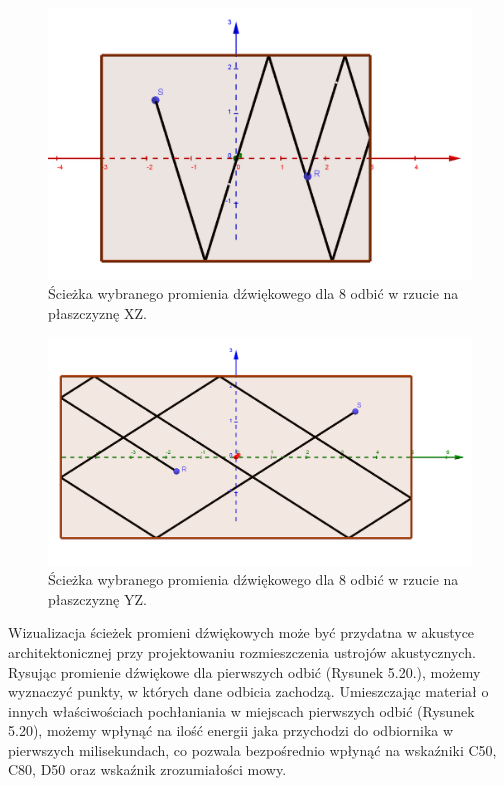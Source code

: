 \begin{figure}[h]
        \centering
                \centering
                \includegraphics[width=12cm]{odbiciay}
	\caption{Ścieżka wybranego promienia dźwiękowego dla 8 odbić w rzucie na płaszczyznę XZ.}
\end{figure}

\begin{figure}[h]
        \centering
                \centering
                \includegraphics[width=12cm]{odbiciax}
	\caption{Ścieżka wybranego promienia dźwiękowego dla 8 odbić w rzucie na płaszczyznę YZ.}
\end{figure}

Wizualizacja ścieżek promieni dźwiękowych może być przydatna w akustyce architektonicznej przy projektowaniu rozmieszczenia ustrojów akustycznych. Rysując promienie dźwiękowe dla pierwszych odbić (Rysunek 5.20.), możemy wyznaczyć punkty, w których dane odbicia zachodzą. Umieszczając materiał o innych właściwościach pochłaniania w miejscach pierwszych odbić (Rysunek 5.20), możemy wpłynąć na ilość energii jaka przychodzi do odbiornika w pierwszych milisekundach, co pozwala bezpośrednio wpłynąć na wskaźniki C50, C80, D50 oraz wskaźnik zrozumiałości mowy.

